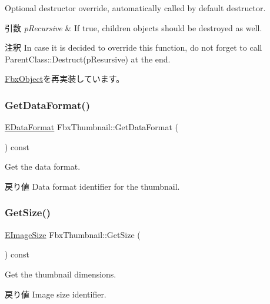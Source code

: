 Optional destructor override, automatically called by default destructor. 
\begin{DoxyParams}{引数}
{\em p\+Recursive} & If true, children objects should be destroyed as well. \\
\hline
\end{DoxyParams}
\begin{DoxyRemark}{注釈}
In case it is decided to override this function, do not forget to call Parent\+Class\+::\+Destruct(p\+Resursive) at the end. 
\end{DoxyRemark}


\hyperlink{class_fbx_object_a123e084d9b32b29c28af6384b7c3c608}{Fbx\+Object}を再実装しています。

\mbox{\label{class_fbx_thumbnail_afa2145d5bf482d2200bb6324a1a717bb}} 
\subsubsection{\texorpdfstring{Get\+Data\+Format()}{GetDataFormat()}}
{\footnotesize\ttfamily \hyperlink{class_fbx_thumbnail_a60bdaa7e6f78e26f4a8810c552958a0a}{E\+Data\+Format} Fbx\+Thumbnail\+::\+Get\+Data\+Format (\begin{DoxyParamCaption}{ }\end{DoxyParamCaption}) const}

Get the data format. \begin{DoxyReturn}{戻り値}
Data format identifier for the thumbnail. 
\end{DoxyReturn}
\mbox{\label{class_fbx_thumbnail_a3cda3700f5acd6d80060fc5f7282ffcf}} 
\subsubsection{\texorpdfstring{Get\+Size()}{GetSize()}}
{\footnotesize\ttfamily \hyperlink{class_fbx_thumbnail_a3d57568544f878eadd9889770443c234}{E\+Image\+Size} Fbx\+Thumbnail\+::\+Get\+Size (\begin{DoxyParamCaption}{ }\end{DoxyParamCaption}) const}

Get the thumbnail dimensions. \begin{DoxyReturn}{戻り値}
Image size identifier. 
\end{DoxyReturn}
\mbox{\label{class_fbx_thumbnail_ae1e5944721bf5e835b67767c734fc74a}} 
